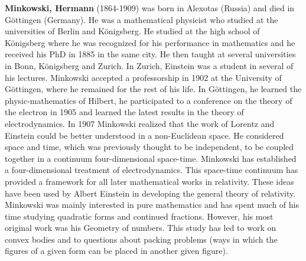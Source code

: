 \textbf{Minkowski, Hermann} (1864-1909) was born in Alexotas (Russia) and died in Göttingen (Germany). He was a mathematical physicist who studied at the universities of Berlin and Königsberg. He studied at the high school of Königsberg where he was recognized for his performance in mathematics and he received his PhD in 1885 in the same city. He then taught at several universities in Bonn, Königsberg and Zurich. In Zurich, Einstein was a student in several of his lectures. Minkowski accepted a professorship in 1902 at the University of Göttingen, where he remained for the rest of his life. In Göttingen, he learned the physic-mathematics of Hilbert, he participated to a conference on the theory of the electron in 1905 and learned the latest results in the theory of electrodynamics. In 1907 Minkowski realized that the work of Lorentz and Einstein could be better understood in a non-Euclidean space. He considered space and time, which was previously thought to be independent, to be coupled together in a continuum four-dimensional space-time. Minkowski has established a four-dimensional treatment of electrodynamics. This space-time continuum has provided a framework for all later mathematical works in relativity. These ideas have been used by Albert Einstein in developing the general theory of relativity. Minkowski was mainly interested in pure mathematics and has spent much of his time studying quadratic forms and continued fractions. However, his most original work was his Geometry of numbers. This study has led to work on convex bodies and to questions about packing problems (ways in which the figures of a given form can be placed in another given figure).

